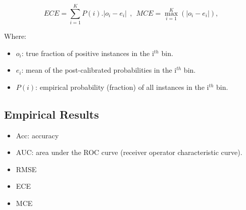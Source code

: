 \documentclass[11pt]{article}
\begin{document}
      $$
      ECE = \sum_{i=1}^{K}P(i).|o_i - e_i| ~~,~~ MCE= \max\limits_{i=1}^{K}(|o_i-e_i|),
      $$

      Where:
      \begin{itemize}
            \item $o_i$: true fraction of positive instances in the i$^{th}$ bin.
            \item $e_i$: mean of the post-calibrated probabilities in the i$^{th}$ bin.
            \item $P(i)$: empirical probability (fraction) of all instances in the i$^{th}$ bin.

      \end{itemize}
      \subsection{Empirical Results}
      \begin{itemize}
            \item Acc: accuracy
            \item AUC: area under the ROC curve (receiver operator characteristic curve).
            \item RMSE
            \item ECE
            \item MCE
      \end{itemize}


\newpage


\end{document}
